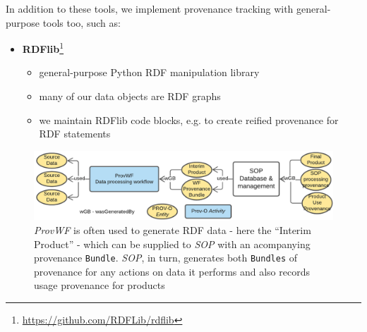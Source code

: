 \documentclass[letterpaper,twocolumn,10pt]{article}
\begin{document}
In addition to these tools, we implement provenance tracking with general-purpose tools too, such as:

\begin{itemize}
  \item \textbf{RDFlib}\footnote{\url{https://github.com/RDFLib/rdflib}}
  \begin{itemize}
    \item general-purpose Python RDF manipulation library
    \item many of our data objects are RDF graphs
    \item we maintain RDFlib code blocks, e.g. to create reified provenance for RDF statements
  \end{itemize}
\end{itemize}  


\begin{figure}[ht]
  \label{fig:provwf-to-sop}
  \begin{center}
    \includegraphics[width=\textwidth]{images/provwf-to-sop.png}
  \end{center}
  \caption{\textit{ProvWF} is often used to generate RDF data - here the ``Interim Product'' - which can be supplied to \textit{SOP} with an acompanying provenance \texttt{Bundle}. \textit{SOP}, in turn, generates both \texttt{Bundles} of provenance for any actions on data it performs and also records usage provenance for products}
\end{figure}
\end{document}
